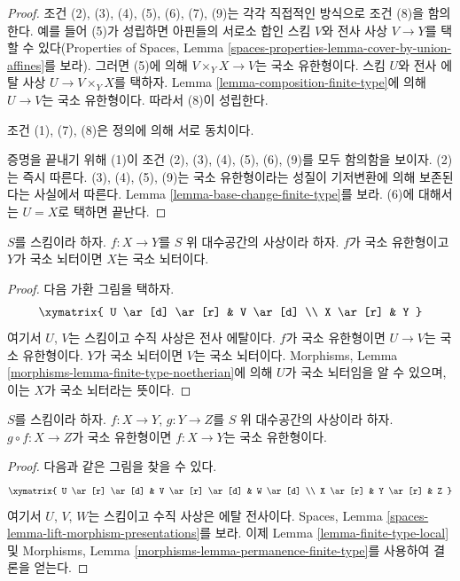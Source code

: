 \begin{proof}
조건 (2), (3), (4), (5), (6), (7), (9)는 각각 직접적인 방식으로
조건 (8)을 함의한다. 예를 들어 (5)가 성립하면
아핀들의 서로소 합인 스킴 $V$와 전사 사상 $V \to Y$를
택할 수 있다(Properties of Spaces, Lemma
\ref{spaces-properties-lemma-cover-by-union-affines}를 보라).
그러면 (5)에 의해 $V \times_Y X \to V$는 국소 유한형이다.
스킴 $U$와 전사 에탈 사상
$U \to V \times_Y X$를 택하자. Lemma
\ref{lemma-composition-finite-type}에 의해 $U \to V$는
국소 유한형이다. 따라서 (8)이 성립한다.

\medskip\noindent
조건 (1), (7), (8)은 정의에 의해 서로 동치이다.

\medskip\noindent
증명을 끝내기 위해 (1)이 조건 (2), (3), (4), (5), (6), (9)를
모두 함의함을 보이자. (2)는 즉시 따른다. (3), (4), (5), (9)는
국소 유한형이라는 성질이 기저변환에 의해 보존된다는 사실에서
따른다. Lemma \ref{lemma-base-change-finite-type}를 보라.
(6)에 대해서는 $U = X$로 택하면 끝난다.
\end{proof}

\begin{lemma}
\label{lemma-locally-finite-type-locally-noetherian}
$S$를 스킴이라 하자.
$f : X \to Y$를 $S$ 위 대수공간의 사상이라 하자.
$f$가 국소 유한형이고 $Y$가 국소 뇌터이면 $X$는 국소 뇌터이다.
\end{lemma}

\begin{proof}
다음 가환 그림을 택하자.
$$
\xymatrix{
U \ar[d] \ar[r] & V \ar[d] \\
X \ar[r] & Y
}
$$
여기서 $U$, $V$는 스킴이고 수직 사상은 전사 에탈이다.
$f$가 국소 유한형이면 $U \to V$는 국소 유한형이다.
$Y$가 국소 뇌터이면 $V$는 국소 뇌터이다.
Morphisms, Lemma \ref{morphisms-lemma-finite-type-noetherian}에
의해 $U$가 국소 뇌터임을 알 수 있으며, 이는 $X$가 국소
뇌터라는 뜻이다.
\end{proof}

\begin{lemma}
\label{lemma-permanence-finite-type}
$S$를 스킴이라 하자.
$f : X \to Y$, $g : Y \to Z$를 $S$ 위 대수공간의 사상이라 하자.
$g \circ f : X \to Z$가 국소 유한형이면
$f : X \to Y$는 국소 유한형이다.
\end{lemma}

\begin{proof}
다음과 같은 그림을 찾을 수 있다.
$$
\xymatrix{
U \ar[r] \ar[d] & V \ar[r] \ar[d] & W \ar[d] \\
X \ar[r] & Y \ar[r] & Z
}
$$
여기서 $U$, $V$, $W$는 스킴이고 수직 사상은 에탈 전사이다.
Spaces, Lemma \ref{spaces-lemma-lift-morphism-presentations}를 보라.
이제 Lemma \ref{lemma-finite-type-local} 및
Morphisms, Lemma \ref{morphisms-lemma-permanence-finite-type}를
사용하여 결론을 얻는다.
\end{proof}

